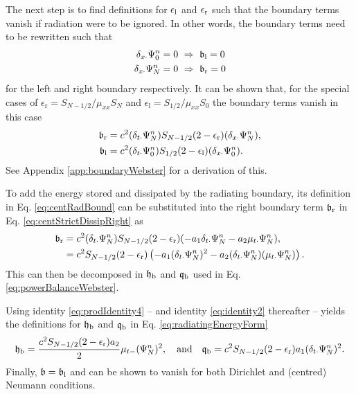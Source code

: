 {The next step is to find definitions for $\epsilon_\text{l}$ and $\epsilon_\text{r}$ such that the boundary terms vanish if radiation were to be ignored. In other words, the boundary terms need to be rewritten such that 
\begin{align*}
    \delta_{x\cdot} \Psi_0^n &= 0\  \Rightarrow\ \mathfrak{b}_\text{l} = 0 \\
    \delta_{x\cdot} \Psi_N^n &= 0\  \Rightarrow\ \mathfrak{b}_\text{r} = 0
\end{align*} 
for the left and right boundary respectively. It can be shown that, for the special cases of $\epsilon_\text{r} = S_{N-1/2}/\mu_{xx}S_N$ and $\epsilon_\text{l} = S_{1/2}/\mu_{xx}S_0$ the boundary terms vanish in this case
\begin{subequations}\label{eq:centStrictDissip}
\begin{align}
    \mathfrak{b}_\text{r} &= c^2 (\delta_{t\cdot}\Psi_N^n)S_{N-1/2}(2-\epsilon_\text{r})(\delta_{x\cdot}\Psi_N^n)\label{eq:centStrictDissipRight},\\
    \mathfrak{b}_\text{l} &= c^2 (\delta_{t\cdot}\Psi_0^n)S_{1/2}(2-\epsilon_\text{l})(\delta_{x\cdot}\Psi_0^n).\label{eq:centStrictDissipLeft}
\end{align}
\end{subequations}
See Appendix \ref{app:boundaryWebster} for a derivation of this. %

To add the energy stored and dissipated by the radiating boundary, its definition in Eq. \eqref{eq:centRadBound} can be substituted into the right boundary term $\mathfrak{b}_\text{r}$ in Eq. \eqref{eq:centStrictDissipRight} as 
\begin{align*}
    \mathfrak{b}_\text{r} &= c^2 (\delta_{t\cdot}\Psi_N^n)S_{N-1/2}(2-\epsilon_\text{r})(-a_1\delta_{t\cdot}\Psi_N^n - a_2\mu_{t\cdot}\Psi_N^n),\\
    &= c^2 S_{N-1/2}(2-\epsilon_\text{r})\left(-a_1(\delta_{t\cdot}\Psi_N^n)^2 - a_2(\delta_{t\cdot}\Psi_N^n)(\mu_{t\cdot}\Psi_N^n)\right).
\end{align*}
This can then be decomposed in $\mathfrak{h}_\text{b}$ and $\mathfrak{q}_\text{b}$ used in Eq. \eqref{eq:powerBalanceWebster}. 

Using identity \eqref{eq:prodIdentity4} -- and identity \eqref{eq:identity2} thereafter -- yields the definitions for $\mathfrak{h}_\text{b}$ and $\mathfrak{q}_\text{b}$ in Eq. \eqref{eq:radiatingEnergyForm}
\begin{equation}
    \mathfrak{h}_\text{b} = \frac{c^2 S_{N-1/2}(2-\epsilon_\text{r}) a_2}{2} \mu_{t-}(\Psi_N^n)^2, \quad \text{and} \quad \mathfrak{q}_\text{b} = c^2 S_{N-1/2}(2-\epsilon_\text{r})a_1(\delta_{t\cdot}\Psi_N^n)^2.
\end{equation}
Finally, $\mathfrak{b} = \mathfrak{b}_\text{l}$ and can be shown to vanish for both Dirichlet and (centred) Neumann conditions.

}
